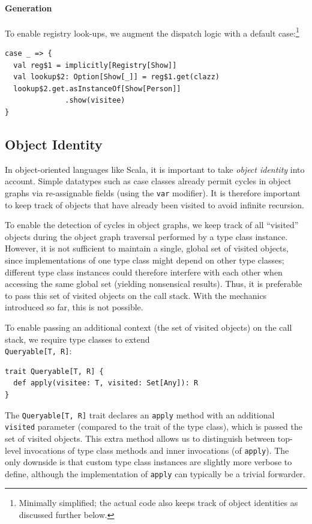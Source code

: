 \documentclass[preprint,nocopyrightspace]{sigplanconf}
\begin{document}
\paragraph{Generation}

To enable registry look-ups, we augment the dispatch logic with a default
case:\footnote{Minimally simplified; the actual code also keeps track of object
identities as discussed further below.}
\begin{lstlisting}
case _ => {
  val reg$1 = implicitly[Registry[Show]]
  val lookup$2: Option[Show[_]] = reg$1.get(clazz)
  lookup$2.get.asInstanceOf[Show[Person]]
              .show(visitee)
}
\end{lstlisting}


\subsection{Object Identity}\label{sec:oo-object-identity}

In object-oriented languages like Scala, it is important to take \emph{object
identity} into account. Simple datatypes such as case classes
already permit cycles in object graphs via re-assignable
fields (using the \verb|var| modifier). It is therefore important to keep
track of objects that have already been visited to avoid infinite recursion.

To enable the detection of cycles in object graphs, we keep track of all
``visited'' objects during the object graph traversal performed by a type
class instance. However, it is not sufficient to maintain a single, global set
of visited objects, since implementations of one type class might depend on
other type classes; different type class instances could therefore interfere
with each other when accessing the same global set (yielding nonsensical
results). Thus, it is preferable to pass this set of visited objects on the
call stack. With the mechanics introduced so far, this is not possible.

To enable passing an additional context (the set of visited objects) on the call stack,
we require type classes to extend \\\verb|Queryable[T, R]|:

\begin{lstlisting}
trait Queryable[T, R] {
  def apply(visitee: T, visited: Set[Any]): R
}
\end{lstlisting}
\noindent
The \verb|Queryable[T, R]| trait declares an \verb|apply| method with an
additional \verb|visited| parameter (compared to the trait of the type class),
which is passed the set of visited objects. This extra method allows us to
distinguish between top-level invocations of type class methods and inner
invocations (of \verb|apply|). The only downside is that custom type class
instances are slightly more verbose to define, although the implementation of
\verb|apply| can typically be a trivial forwarder.
\end{document}
